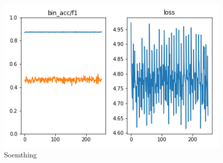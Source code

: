 \begin{frame}
	\frametitle{\overtitle}
	\begin{figure}
		\includegraphics[width=\textwidth]{images/final_model.png}
		\caption{Soemthing}
	\end{figure}
\end{frame}
